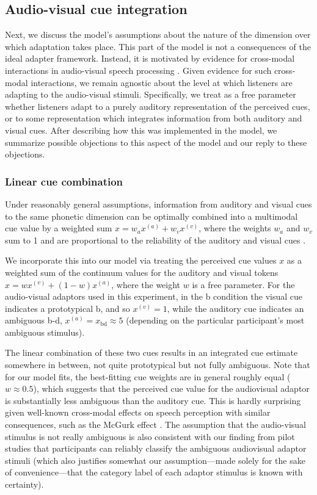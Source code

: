 \subsection{Audio-visual cue integration}
\label{sec:audio-visual-cue}

Next, we discuss the model's assumptions about the nature of the dimension over which adaptation takes place. This part of the model is not a consequences of the ideal adapter framework. Instead, it is motivated by evidence for cross-modal interactions in audio-visual speech processing \cite{Bejjanki2011,McGurk1976}. Given evidence for such cross-modal interactions, we remain agnostic about the level at which listeners are adapting to the audio-visual stimuli. Specifically, we treat as a free parameter whether listeners adapt to a purely auditory representation of the perceived cues, or to some representation which integrates information from both auditory and visual cues. After describing how this was implemented in the model, we summarize possible objections to this aspect of the model and our reply to these objections.

\subsubsection{Linear cue combination}
\label{sec:line-cue-comb}

Under reasonably general assumptions, information from auditory and visual cues to the same phonetic dimension can be optimally combined into a multimodal cue value by a weighted sum $x=w_a x^{(a)} + w_v x^{(v)}$, where the weights $w_a$ and $w_v$ sum to 1 and are proportional to the reliability of the auditory and visual cues \cite{Bejjanki2011,Ernst2002,Jacobs2002,Knill2003,Toscano2010}.

We incorporate this into our model via treating the perceived cue values $x$ as a weighted sum of the continuum values for the auditory and visual tokens $x=wx^{(v)} + (1-w)x^{(a)}$, where the weight $w$ is a free parameter.  For the audio-visual adaptors used in this experiment, in the \ph b condition the visual cue indicates a prototypical \ph b, and so $x^{(v)} = 1$, while the auditory cue indicates an ambiguous \ph b-\ph d, $x^{(a)} = x_\mathrm{bd} \approx 5$ (depending on the particular participant's most ambiguous stimulus).

The linear combination of these two cues results in an integrated cue estimate somewhere in between, not quite prototypical but not fully ambiguous.  Note that for our model fits, the best-fitting cue weights are in general roughly equal ($w\approx 0.5$), which suggests that the perceived cue value for the audiovisual adaptor is substantially less ambiguous than the auditory cue. This is hardly surprising given well-known cross-modal effects on speech perception with similar consequences, such as the McGurk effect \cite{McGurk1976}.
The assumption that the audio-visual stimulus is  not really ambiguous is also consistent with our finding from pilot studies that participants can reliably classify the ambiguous audiovisual adaptor stimuli (which also justifies somewhat our assumption---made solely for the sake of convenience---that the category label of each adaptor stimulus is known with certainty).

